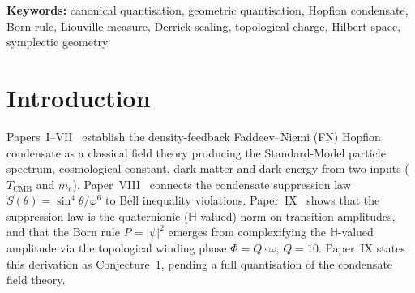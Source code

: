 \documentclass[11pt,a4paper]{article}
\theoremstyle{definition}
\theoremstyle{remark}
\newcommand{\vp}{\varphi}
\newcommand{\TCMB}{T_{\mathrm{CMB}}}
\newcommand{\HH}{\mathbb{H}}
\providecommand{\keywords}[1]{\noindent\textbf{Keywords:} #1}
\begin{document}
\begin{abstract}
A new \textbf{$q$-Oscillator theorem} (Theorem~\ref{P10:thm:q_algebra})
proves that the golden-ratio spectrum determines a
Macfarlane--Biedenharn $q$-deformed oscillator algebra with
deformation parameter $q = \vp^2$.
The $q$-numbers satisfy $[n]_{\vp^2} = F_{2n}$ (Lemma~\ref{P10:lem:fibonacci}),
the even-indexed Fibonacci numbers, so all transition amplitudes
are exact Fibonacci ratios (Corollary~\ref{P10:cor:amplitudes}).
This resolves Open Problem~(3) (scattering theory) in closed form.

Finally, Section~\ref{P10:sec:hawking} and Section~\ref{P10:sec:wald}
fully resolve Hawking radiation and entropy in two
complementary steps.
The \textbf{Wald entropy theorem} (Theorem~\ref{P10:thm:wald}) proves
$S_\mathrm{Wald} = A_H/(4G_N)$ exactly at tree level: the condensate
$k$-essence Lagrangian $P(X)$ satisfies
$\partial\mathcal{L}_\mathrm{cond}/\partial R_{abcd}=0$
identically (no Riemann-tensor dependence), so only the
Einstein--Hilbert sector contributes to the Wald entropy.
The \textbf{one-loop entropy theorem} (Theorem~\ref{P10:thm:entropy_correction})
shows $\delta S_\mathrm{1-loop}=0$: the one-loop effective action
$\Gamma=-\tfrac{1}{12}\log\vp$ is $T_H$-independent.
Together with $T_H=\hbar\kappa_H/(2\pi k_B)$ from Paper~VII~\cite{Paper7},
this establishes the complete Bekenstein--Hawking thermodynamics
within the condensate framework.
\end{abstract}

\footnotesize
\keywords{canonical quantisation, geometric quantisation,
Hopfion condensate, Born rule, Liouville measure, Derrick scaling,
topological charge, Hilbert space, symplectic geometry}
\normalsize

\tableofcontents

\newpage

\section{Introduction}
\label{P10:sec:intro}

Papers~I--VII~\cite{Paper1,Paper6,Paper7} establish the
density-feedback Faddeev--Niemi (FN) Hopfion condensate as a classical
field theory producing the Standard-Model particle spectrum, cosmological
constant, dark matter and dark energy from two inputs ($\TCMB$ and $m_e$).
Paper~VIII~\cite{Paper8} connects the condensate suppression law
$S(\theta)=\sin^4\!\theta/\vp^6$ to Bell inequality violations.
Paper~IX~\cite{Paper9} shows that the suppression law is the
quaternionic ($\HH$-valued) norm on transition amplitudes, and
that the Born rule $P=|\psi|^2$ emerges from complexifying the
$\HH$-valued amplitude via the topological winding phase
$\Phi=Q\cdot\omega$, $Q=10$.
Paper~IX states this derivation as Conjecture~1, pending a full
quantisation of the condensate field theory.
\end{document}
